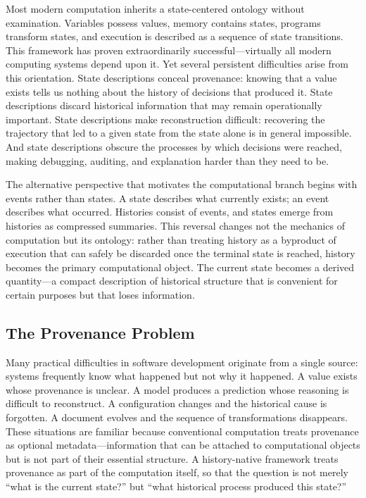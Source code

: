 \documentclass[11pt, oneside]{book}
\theoremstyle{definition}
\theoremstyle{remark}
\begin{document}
Most modern computation inherits a state-centered ontology without examination. Variables possess values, memory contains states, programs transform states, and execution is described as a sequence of state transitions. This framework has proven extraordinarily successful—virtually all modern computing systems depend upon it. Yet several persistent difficulties arise from this orientation. State descriptions conceal provenance: knowing that a value exists tells us nothing about the history of decisions that produced it. State descriptions discard historical information that may remain operationally important. State descriptions make reconstruction difficult: recovering the trajectory that led to a given state from the state alone is in general impossible. And state descriptions obscure the processes by which decisions were reached, making debugging, auditing, and explanation harder than they need to be.

The alternative perspective that motivates the computational branch begins with events rather than states. A state describes what currently exists; an event describes what occurred. Histories consist of events, and states emerge from histories as compressed summaries. This reversal changes not the mechanics of computation but its ontology: rather than treating history as a byproduct of execution that can safely be discarded once the terminal state is reached, history becomes the primary computational object. The current state becomes a derived quantity—a compact description of historical structure that is convenient for certain purposes but that loses information.

\subsection{The Provenance Problem}

Many practical difficulties in software development originate from a single source: systems frequently know what happened but not why it happened. A value exists whose provenance is unclear. A model produces a prediction whose reasoning is difficult to reconstruct. A configuration changes and the historical cause is forgotten. A document evolves and the sequence of transformations disappears. These situations are familiar because conventional computation treats provenance as optional metadata—information that can be attached to computational objects but is not part of their essential structure. A history-native framework treats provenance as part of the computation itself, so that the question is not merely ``what is the current state?'' but ``what historical process produced this state?''
\end{document}
